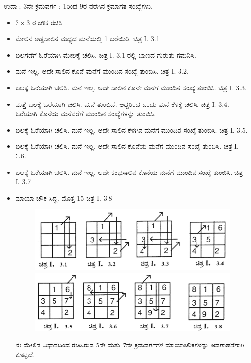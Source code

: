 ಉದಾ : 3ನೇ ಕ್ರಮವರ್ಗ ; 1ರಿಂದ 9ರ ವರೆಗಿನ ಕ್ರಮಾಗತ ಸಂಖ್ಯೆಗಳು.
\begin{itemize}
	\item $3 \times 3$ ರ ಚೌಕ ರಚಿಸಿ
	\item ಮೇಲಿನ ಅಡ್ಡಸಾಲಿನ ಮಧ್ಯದ ಮನೆಯಲ್ಲಿ 1 ಬರೆಯಿರಿ. ಚಿತ್ರ I. 3.1
	\item ಬಲಗಡೆಗೆ ಓರೆಯಾಗಿ ಮೇಲಕ್ಕೆ ಚಲಿಸಿ. ಚಿತ್ರ I. 3.1 ರಲ್ಲಿ ಬಾಣದ ಗುರುತು ಗಮನಿಸಿ.
	\item ಮನೆ ಇಲ್ಲ. ಅದೇ ಸಾಲಿನ ಕೊನೆ ಮನೆಗೆ ಮುಂದಿನ ಸಂಖ್ಯೆ ತುಂಬಿಸಿ. ಚಿತ್ರ I. 3.2.
	\item ಬಲಕ್ಕೆ ಓರೆಯಾಗಿ ಚಲಿಸಿ. ಮನೆ ಇಲ್ಲ. ಅದೇ ಸಾಲಿನ ಕೊನೇ ಮನೆಗೆ ಮುಂದಿನ ಸಂಖ್ಯೆ ತುಂಬಿಸಿ. ಚಿತ್ರ I. 3.3.
	\item ಮತ್ತೆ ಬಲಕ್ಕೆ ಓರೆಯಾಗಿ ಚಲಿಸಿ. ಮನೆ ತುಂಬಿದೆ. ಆದ್ದರಿಂದ ಒಂದು ಮನೆ ಕೆಳಕ್ಕೆ ಚಲಿಸಿ. ಚಿತ್ರ I. 3.4. ಓರೆಯಾಗಿ ಕೊನೆಯ ಮನೆವರೆಗೆ ಮುಂದಿನ ಸಂಖ್ಯೆಗಳನ್ನು ತುಂಬಿಸಿ.
	\item ಬಲಕ್ಕೆ ಓರೆಯಾಗಿ ಚಲಿಸಿ. ಮನೆ ಇಲ್ಲ. ಅದೇ ಸಾಲಿನ ಕೆಳಗಿನ ಮನೆಗೆ ಮುಂದಿನ ಸಂಖ್ಯೆ ತುಂಬಿಸಿ. ಚಿತ್ರ I. 3.5.
	\item ಬಲಕ್ಕೆ ಓರೆಯಾಗಿ ಚಲಿಸಿ. ಮನೆ ಇಲ್ಲ. ಅದೇ ಸಾಲಿನ ಕೊನೆಯ ಮನೆಗೆ ಮುಂದಿನ ಸಂಖ್ಯೆ ತುಂಬಿಸಿ. ಚಿತ್ರ I. 3.6.
	\item ಬಲಕ್ಕೆ ಓರೆಯಾಗಿ ಚಲಿಸಿ. ಮನೆ ಇಲ್ಲ. ಅದೇ ಕಂಭಸಾಲಿನ ಕೊನೆಯ ಮನೆಗೆ \break ಮುಂದಿನ ಸಂಖ್ಯೆ ತುಂಬಿಸಿ. ಚಿತ್ರ I. 3.7
	\item ಮಾಯಾ ಚೌಕ ಸಿದ್ಧ. ಮೊತ್ತ 15 ಚಿತ್ರ I. 3.8
	\begin{figure}[H]
	\includegraphics{src/figures/chap3/fig3-6.jpg}\\
	\includegraphics{src/figures/chap3/fig3-7.jpg}
	\end{figure}
	ಈ ಮೇಲಿನ ವಿಧಾನದಿಂದ ರಚಿಸಿರುವ 5ನೇ ಮತ್ತು 7ನೇ ಕ್ರಮವರ್ಗಗಳ ಮಾಯಾಚೌಕಗಳನ್ನು ಅವಗಾಹನೆಗಾಗಿ ಕೊಟ್ಟಿದೆ.
	\begin{figure}[H]

\end{figure}
\end{itemize}
